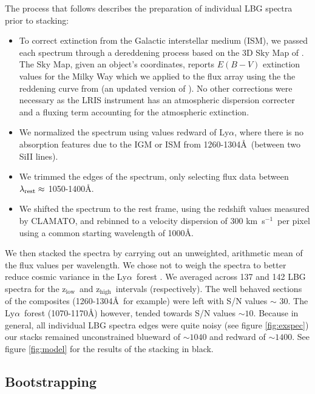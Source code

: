 \documentclass[twocolumn,tight,times]{aastex63}
\newcommand{\lya}{Ly$\alpha$}
\newcommand{\kms}{km~s$^{-1}$}
\newcommand{\hiz}{$\mathrm{z_{high}}$}
\newcommand{\loz}{$\mathrm{z_{low}}$}
\begin{document}
The process that follows describes the preparation of individual LBG spectra prior to stacking:
\begin{itemize}
  \item To correct extinction from the Galactic interstellar medium (ISM), we passed each spectrum through a dereddening process based on the 3D Sky Map of \cite{Green_2018}. The Sky Map, given an object's coordinates, reports $E(B-V)$ extinction values for the Milky Way which we applied to the flux array using the the reddening curve from \cite{O'Donnell_1994} (an updated version of \citep{CCM_1989}). No other corrections were necessary as the LRIS instrument has an atmospheric dispersion correcter and a fluxing term accounting for the atmospheric extinction.
  
  \item We normalized the spectrum using values redward of \lya, where there is no absorption features due to the IGM or ISM from 1260-1304\AA\ (between two SiII lines).
  
  \item We trimmed the edges of the spectrum, only selecting flux data between $\lambda_{\rm rest} \approx$ 1050-1400\AA.
  
  \item We shifted the spectrum to the rest frame, using the redshift values measured by CLAMATO, and rebinned to a velocity dispersion of 300 \kms\ per pixel using a common starting wavelength of 1000\AA.
\end{itemize}

We then stacked the spectra by carrying out an unweighted, arithmetic mean of the flux values per wavelength. We chose not to weigh the spectra to better reduce cosmic variance in the \lya\ forest \citep{Becker_2013}. We averaged across 137 and 142 LBG spectra for the \loz\ and \hiz\ intervals (respectively). The well behaved sections of the composites (1260-1304\AA\ for example) were left with S/N values $\sim$ 30. The \lya\ forest (1070-1170\AA) however, tended towards S/N values $\sim 10$. Because in general, all individual LBG spectra edges were quite noisy (see figure \ref{fig:exspec}) our stacks remained unconstrained blueward of $\sim 1040$ and redward of $\sim 1400$. See figure \ref{fig:model} for the results of the stacking in black.

\subsection{Bootstrapping}
\label{subsec:bootstrap}
\end{document}
